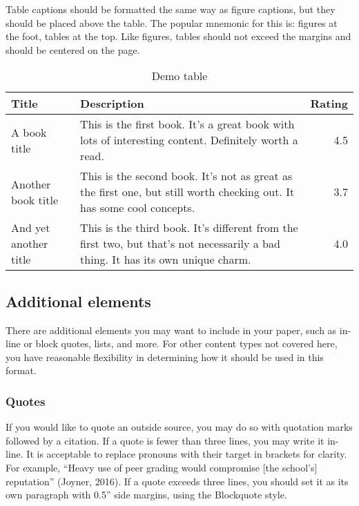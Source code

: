 \documentclass{jdf}
\begin{document}
Table captions should be formatted the same way as figure captions, but
they should be placed above the table. The popular mnemonic for this is:
figures at the foot, tables at the top. Like figures, tables should not
exceed the margins and should be centered on the page.

\begin{table}

\caption{\label{tab:unnamed-chunk-2}Demo table}
\centering
\begin{tabular}[t]{l>{\raggedright\arraybackslash}p{20em}r}
\toprule
\textbf{Title} & \textbf{Description} & \textbf{Rating}\\
\midrule
A book title & This is the first book. It's a great book with lots of interesting content. Definitely worth a read. & 4.5\\
Another book title & This is the second book. It's not as great as the first one, but still worth checking out. It has some cool concepts. & 3.7\\
And yet another title & This is the third book. It's different from the first two, but that's not necessarily a bad thing. It has its own unique charm. & 4.0\\
\bottomrule
\end{tabular}
\end{table}

\hypertarget{additional-elements}{%
\subsection{Additional elements}\label{additional-elements}}

There are additional elements you may want to include in your paper,
such as in-line or block quotes, lists, and more. For other content
types not covered here, you have reasonable flexibility in determining
how it should be used in this format.

\hypertarget{quotes}{%
\subsubsection{Quotes}\label{quotes}}

If you would like to quote an outside source, you may do so with
quotation marks followed by a citation. If a quote is fewer than three
lines, you may write it in-line. It is acceptable to replace pronouns
with their target in brackets for clarity. For example, ``Heavy use of
peer grading would compromise {[}the school's{]} reputation'' (Joyner,
2016). If a quote exceeds three lines, you should set it as its own
paragraph with 0.5'' side margins, using the Blockquote style.
\end{document}
